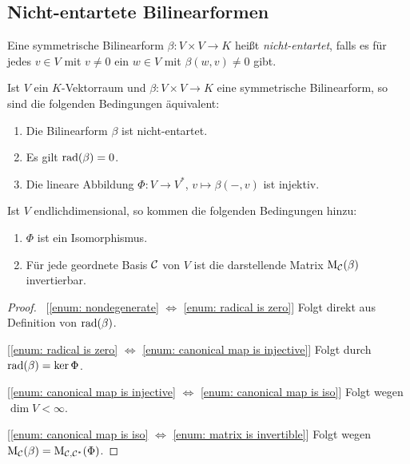 \subsection{Nicht-entartete Bilinearformen}


\begin{definition}
  Eine symmetrische Bilinearform $\beta \colon V \times V \to K$ heißt \emph{nicht-entartet}, falls es für jedes $v \in V$ mit $v \neq 0$ ein $w \in V$ mit $\beta(w,v) \neq 0$ gibt.
\end{definition}


\begin{proposition}
  Ist $V$ ein $K$-Vektorraum und $\beta \colon V \times V \to K$ eine symmetrische Bilinearform, so sind die folgenden Bedingungen äquivalent:
  \begin{enumerate}[leftmargin=*, label=\roman*)]
    \item\label{enum: nondegenerate}
      Die Bilinearform $\beta$ ist nicht-entartet.
    \item\label{enum: radical is zero}
      Es gilt $\operatorname{rad}(\beta) = 0$.
    \item\label{enum: canonical map is injective}
      Die lineare Abbildung $\Phi \colon V \to V^*$, $v \mapsto \beta(-,v)$ ist injektiv.
  \end{enumerate}
  Ist $V$ endlichdimensional, so kommen die folgenden Bedingungen hinzu:
  \begin{enumerate}[leftmargin=*, label=\roman*), resume]
    \item\label{enum: canonical map is iso}
      $\Phi$ ist ein Isomorphismus.
    \item\label{enum: matrix is invertible}
      Für jede geordnete Basis $\mathcal{C}$ von $V$ ist die darstellende Matrix $\mathrm{M}_{\mathcal{C}}(\beta)$ invertierbar.
  \end{enumerate}
\end{proposition}


\begin{proof}\,
  [\ref{enum: nondegenerate} $\iff$ \ref{enum: radical is zero}]
    Folgt direkt aus Definition von $\operatorname{rad}(\beta)$.
  
  [\ref{enum: radical is zero} $\iff$ \ref{enum: canonical map is injective}]
    Folgt durch $\operatorname{rad}(\beta) = \ker \Phi$.
  
  [\ref{enum: canonical map is injective} $\iff$ \ref{enum: canonical map is iso}]
    Folgt wegen $\dim V < \infty$.
  
  [\ref{enum: canonical map is iso} $\iff$ \ref{enum: matrix is invertible}]
    Folgt wegen $\mathrm{M}_{\mathcal{C}}(\beta) = \mathrm{M}_{\mathcal{C}, \mathcal{C}^*}(\Phi)$.
\end{proof}



